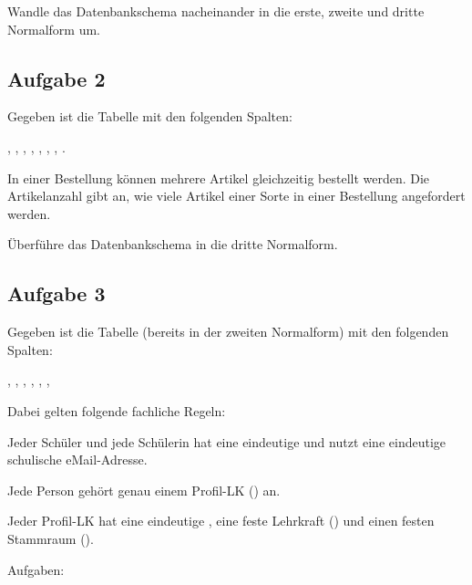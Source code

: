 Wandle das Datenbankschema nacheinander in die erste, zweite und dritte
Normalform um.


\subsection{Aufgabe 2}

Gegeben ist die Tabelle  mit den folgenden Spalten:

, ,
, ,
, ,
, .

In einer Bestellung können mehrere Artikel gleichzeitig bestellt werden. Die
Artikelanzahl gibt an, wie viele Artikel einer Sorte in einer Bestellung
angefordert werden.

Überführe das Datenbankschema in die dritte Normalform.


\subsection{Aufgabe 3}

Gegeben ist die Tabelle  (bereits in der zweiten 
Normalform) mit den folgenden Spalten: 

, , , 
, , , 

Dabei gelten folgende fachliche Regeln:

\begin{compactitem}
\item Jeder Schüler und jede Schülerin hat eine eindeutige 
 und nutzt eine eindeutige schulische eMail-Adresse.
\item Jede Person gehört genau einem Profil-LK () 
an.
\item Jeder Profil-LK hat eine eindeutige , eine 
feste Lehrkraft () und einen festen Stammraum 
().
\end{compactitem}

Aufgaben:

